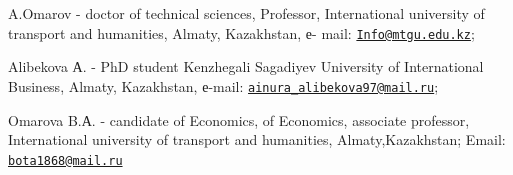 A.Omarov - doctor of technical sciences, Professor, International
university of transport and humanities, Almaty, Kazakhstan, е- mail:
\href{mailto:Info@mtgu.edu.kz}{\nolinkurl{Info@mtgu.edu.kz}};

Alibekova А. - PhD student Kenzhegali Sagadiyev University of
International Business, Almaty, Kazakhstan, е-mail:
\href{mailto:ainura_alibekova97@mail.ru}{\nolinkurl{ainura\_alibekova97@mail.ru}};

Omarova B.А. - candidate of Economics, of Economics, associate
professor, International university of transport and humanities,
Almaty,Kazakhstan; Email:
\href{mailto:bota1868@mail.ru}{\nolinkurl{bota1868@mail.ru}}